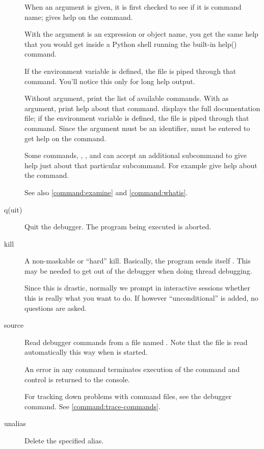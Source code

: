\begin{description}
When an argument is given, it is first checked to see if it is command
name;  gives help on the \samp{!} command.

With the argument is an expression or object name, you get the same
help that you would get inside a Python shell running the built-in
help() command.

If the environment variable  is defined, the file is
piped through that command.  You'll notice this only for long help
output.

Without argument, print the list of available commands.  With
 as argument, print help about that command.   displays the full documentation file; if the environment
variable  is defined, the file is piped through that
command.  Since the  argument must be an identifier,
 must be entered to get help on the \samp{!} command.

Some commands, , , and  can accept an
additional subcommand to give help just about that particular
subcommand. For example  give help about the
 command.

See also \ref{command:examine} and \ref{command:whatis}.

\item[q(uit)]\label{command:quit}

Quit the debugger. The program being executed is aborted.

\item[kill \optional{unconditional}]\label{command:kill}

A non-maskable or ``hard'' kill. Basically, the program sends itself
. This may be needed to get out of the debugger when
doing thread debugging.

Since this is drastic, normally we prompt in interactive sessions
whether this is really what you want to do. If however
``unconditional'' is added, no questions are asked.

\item[source \var{filename}]\label{command:source}

Read debugger commands from a file named .
Note that the file  is read automatically
this way when  is started.

An error in any command terminates execution of the command and
control is returned to the console.

For tracking down problems with command files, see the  debugger command. See \ref{command:trace-commands}. 

\item[unalias \var{name}]\label{command:unalias}

Delete the specified alias.

\end{description}

